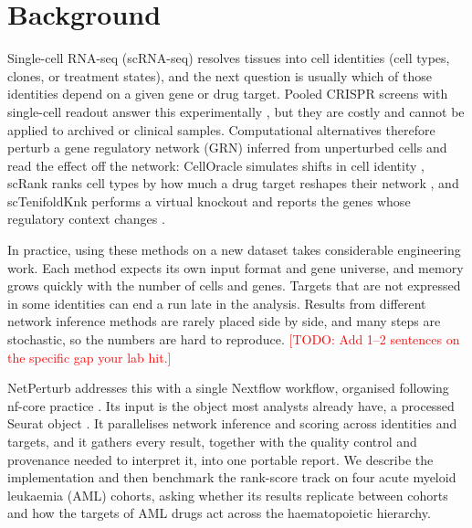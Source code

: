 \documentclass[pdflatex,sn-vancouver-num]{sn-jnl}%
\newcommand{\todo}[1]{\textcolor{red}{[TODO: #1]}}
\begin{document}
\section{Background}\label{sec:background}

Single-cell RNA-seq (scRNA-seq) resolves tissues into cell identities (cell types, clones, or treatment states), and the next question is usually which of those identities depend on a given gene or drug target. Pooled CRISPR screens with single-cell readout answer this experimentally \citep{Dixit2016perturbseq}, but they are costly and cannot be applied to archived or clinical samples. Computational alternatives therefore perturb a gene regulatory network (GRN) inferred from unperturbed cells and read the effect off the network: CellOracle simulates shifts in cell identity \citep{Kamimoto2023celloracle}, scRank ranks cell types by how much a drug target reshapes their network \citep{Li2024scrank}, and scTenifoldKnk performs a virtual knockout and reports the genes whose regulatory context changes \citep{Osorio2022sctenifoldknk}.

In practice, using these methods on a new dataset takes considerable engineering work. Each method expects its own input format and gene universe, and memory grows quickly with the number of cells and genes. Targets that are not expressed in some identities can end a run late in the analysis. Results from different network inference methods are rarely placed side by side, and many steps are stochastic, so the numbers are hard to reproduce. \todo{Add 1--2 sentences on the specific gap your lab hit.}

NetPerturb addresses this with a single Nextflow \citep{DiTommaso2017nextflow} workflow, organised following nf-core practice \citep{Ewels2020nfcore}. Its input is the object most analysts already have, a processed Seurat object \citep{Hao2023seurat}. It parallelises network inference and scoring across identities and targets, and it gathers every result, together with the quality control and provenance needed to interpret it, into one portable report. We describe the implementation and then benchmark the rank-score track on four acute myeloid leukaemia (AML) cohorts, asking whether its results replicate between cohorts and how the targets of AML drugs act across the haematopoietic hierarchy.

\end{document}
